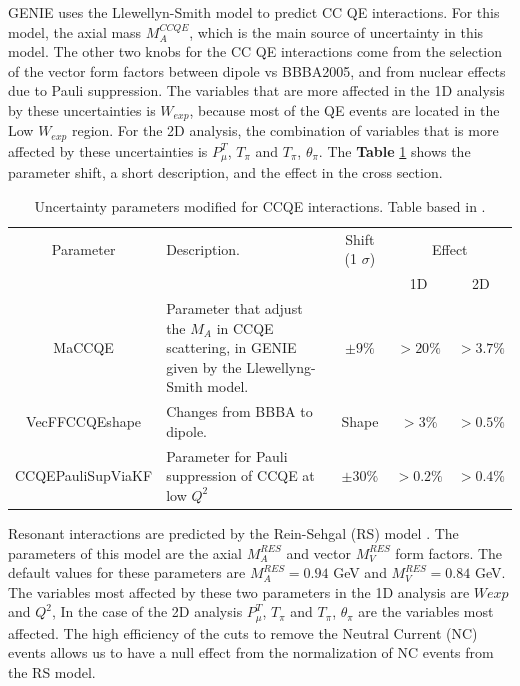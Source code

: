 GENIE uses the Llewellyn-Smith model to predict CC QE interactions. For this model, the axial mass $M^{CCQE}_A$, which is the main source of uncertainty in this model. The other two knobs for the CC QE interactions come from the selection of the vector form factors between dipole vs BBBA2005, and from nuclear effects due to Pauli suppression. The variables that are more affected in the 1D analysis by these uncertainties is $W_{exp}$, because most of the QE events are located in the Low $W_{exp}$ region. For the 2D analysis, the combination of variables that is more affected by these uncertainties is $P^T_\mu$, $T_\pi$ and $T_\pi$, $\theta_\pi$. The \textbf{Table} \ref{tab:ErrorAnalysis:SystematicUnc:GenieCCQEmodels} shows the parameter shift, a short description, and the effect in the cross section. 
 
\begin{table}[!htb]
    \centering
    \begin{tabular}{c|p{1.5in}|c|c|c}
        \hline 
        Parameter & Description.  & Shift (1 $\sigma$) & \multicolumn{2}{c}{Effect} \\
         & & & 1D & 2D \\
        \hline  
        MaCCQE & Parameter that adjust the $M_A$ in CCQE scattering, in GENIE given by the Llewellyng-Smith model. & $\pm9\%$ & $>20\%$ & $>3.7\%$ \\ \hline
        VecFFCCQEshape & Changes from BBBA to dipole. & Shape & $>3\%$ & $>0.5\%$ \\
        \hline
        CCQEPauliSupViaKF & Parameter for Pauli suppression of CCQE at low $Q^2$ &$\pm30\%$ & $>0.2\%$ & $>0.4\%$ \\ \hline
        
    \end{tabular}
    \caption{Uncertainty parameters modified for CCQE interactions. Table based in \cite{GENIEUnc}.}
    \label{tab:ErrorAnalysis:SystematicUnc:GenieCCQEmodels}
\end{table}

Resonant interactions are predicted by the Rein-Sehgal (RS) model \cite{REIN198179}. The parameters of this model are the axial $M^{RES}_A$ and vector $M^{RES}_V$ form factors. The default values for these parameters are $M^{RES}_A=0.94$ GeV and $M^{RES}_V =0.84$ GeV. The variables most affected by these two parameters in the 1D analysis are $W{exp}$ and $Q^2$, In the case of the 2D analysis $P^T_\mu$, $T_\pi$ and $T_\pi$, $\theta_\pi$ are the variables most affected. The high efficiency of the cuts to remove the Neutral Current (NC) events allows us to have a null effect from the normalization of NC events from the RS model.

